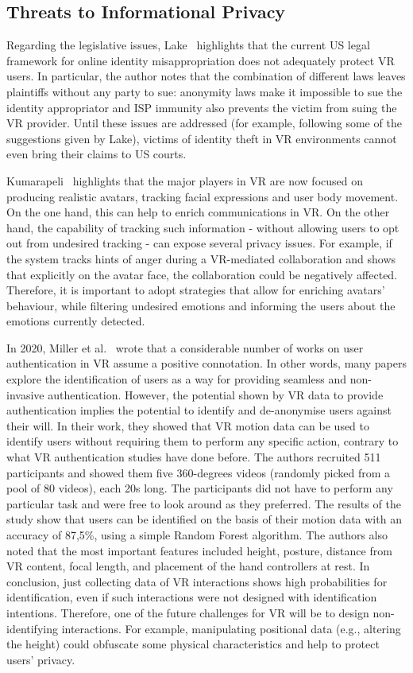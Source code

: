 \documentclass[journal]{IEEEtran}
\begin{document}
\subsection{Threats to Informational Privacy}
Regarding the legislative issues, Lake~\cite{lake2020} highlights that the current US legal framework for online identity misappropriation does not adequately protect VR users. In particular, the author notes that the combination of different laws leaves plaintiffs without any party to sue: anonymity laws make it impossible to sue the identity appropriator and ISP immunity also prevents the victim from suing the VR provider. Until these issues are addressed (for example, following some of the suggestions given by Lake), victims of identity theft in VR environments cannot even bring their claims to US courts.

Kumarapeli~\cite{kumarapeli2021} highlights that the major players in VR are now focused on producing realistic avatars, tracking facial expressions and user body movement. On the one hand, this can help to enrich communications in VR. On the other hand, the capability of tracking such information - without allowing users to opt out from undesired tracking - can expose several privacy issues. For example, if the system tracks hints of anger during a VR-mediated collaboration and shows that explicitly on the avatar face, the collaboration could be negatively affected. Therefore, it is important to adopt strategies that allow for enriching avatars' behaviour, while filtering undesired emotions and informing the users about the emotions currently detected. 

In 2020, Miller et al.~\cite{miller2020personal} wrote that a considerable number of works on user authentication in VR assume a positive connotation. In other words, many papers explore the identification of users as a way for providing seamless and non-invasive authentication. However, the potential shown by VR data to provide authentication implies the potential to identify and de-anonymise users against their will. In their work, they showed that VR motion data can be used to identify users without requiring them to perform any specific action, contrary to what VR authentication studies have done before. The authors recruited 511 participants and showed them five 360-degrees videos (randomly picked from a pool of 80 videos), each 20s long. The participants did not have to perform any particular task and were free to look around as they preferred. The results of the study show that users can be identified on the basis of their motion data with an accuracy of 87,5\%, using a simple Random Forest algorithm. The authors also noted that the most important features included height, posture, distance from VR content, focal length, and placement of the hand controllers at rest. In conclusion, just collecting data of VR interactions shows high probabilities for identification, even if such interactions were not designed with identification intentions. Therefore, one of the future challenges for VR will be to design non-identifying interactions. For example, manipulating positional data (e.g., altering the height) could obfuscate some physical characteristics and help to protect users' privacy.
\end{document}

